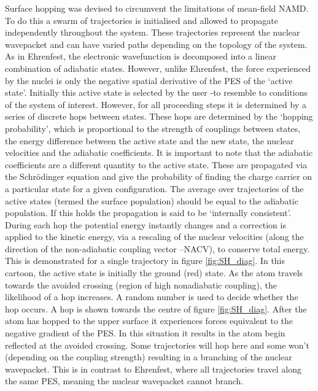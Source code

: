 Surface hopping was devised to circumvent the limitations of mean-field NAMD. To do this a swarm of trajectories is initialised and allowed to propagate independently throughout the system. These trajectories represent the nuclear wavepacket and can have varied paths depending on the topology of the system. As in Ehrenfest, the electronic wavefunction is decomposed into a linear combination of adiabatic states. However, unlike Ehrenfest, the force experienced by the nuclei is only the negative spatial derivative of the PES of the `active state'. Initially this active state is selected by the user -to resemble to conditions of the system of interest. However, for all proceeding steps it is determined by a series of discrete hops between states. These hops are determined by the `hopping probability', which is proportional to the strength of couplings between states, the energy difference between the active state and the new state, the nuclear velocities and the adiabatic coefficients. It is important to note that the adiabatic coefficients are a different quantity to the active state. These are propagated via the Schr\"odinger equation and give the probability of finding the charge carrier on a particular state for a given configuration. The average over trajectories of the active states  (termed the surface population) should be equal to the adiabatic population. If this holds the propagation is said to be `internally consistent'. During each hop the potential energy instantly changes and a correction is applied to the kinetic energy, via a rescaling of the nuclear velocities (along the direction of the non-adiabatic coupling vector --NACV), to conserve total energy. This is demonstrated for a single trajectory in figure \ref{fig:SH_diag}. In this cartoon, the active state is initially the ground (red) state. As the atom travels towards the avoided crossing (region of high nonadiabatic coupling), the likelihood of a hop increases. A random number is used to decide whether the hop occurs. A hop is shown towards the centre of figure \ref{fig:SH_diag}. After the atom has hopped to the upper surface it experiences forces equivalent to the negative gradient of the PES. In this situation it results in the atom begin reflected at the avoided crossing. Some trajectories will hop here and some won't (depending on the coupling strength) resulting in a branching of the nuclear wavepacket. This is in contrast to Ehrenfest, where all trajectories travel along the same PES, meaning the nuclear wavepacket cannot branch.
\\\\
